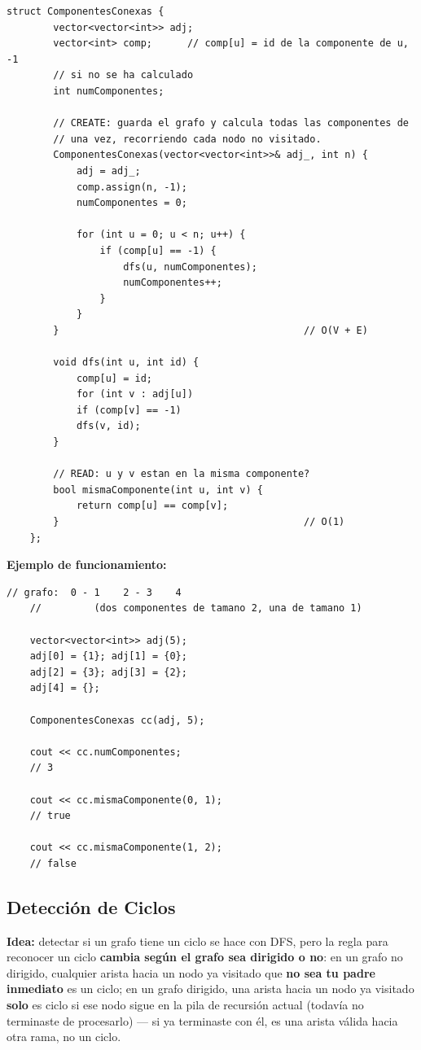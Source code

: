 \documentclass[10pt,a4paper,twocolumn]{article}
\begin{document}
\begin{lstlisting}[style=cpp]
	struct ComponentesConexas {
		vector<vector<int>> adj;
		vector<int> comp;      // comp[u] = id de la componente de u, -1
		// si no se ha calculado
		int numComponentes;
		
		// CREATE: guarda el grafo y calcula todas las componentes de
		// una vez, recorriendo cada nodo no visitado.
		ComponentesConexas(vector<vector<int>>& adj_, int n) {
			adj = adj_;
			comp.assign(n, -1);
			numComponentes = 0;
			
			for (int u = 0; u < n; u++) {
				if (comp[u] == -1) {
					dfs(u, numComponentes);
					numComponentes++;
				}
			}
		}                                          // O(V + E)
		
		void dfs(int u, int id) {
			comp[u] = id;
			for (int v : adj[u])
			if (comp[v] == -1)
			dfs(v, id);
		}
		
		// READ: u y v estan en la misma componente?
		bool mismaComponente(int u, int v) {
			return comp[u] == comp[v];
		}                                          // O(1)
	};
\end{lstlisting}

\textbf{Ejemplo de funcionamiento:}

\begin{lstlisting}[style=cpp]
	// grafo:  0 - 1    2 - 3    4
	//         (dos componentes de tamano 2, una de tamano 1)
	
	vector<vector<int>> adj(5);
	adj[0] = {1}; adj[1] = {0};
	adj[2] = {3}; adj[3] = {2};
	adj[4] = {};
	
	ComponentesConexas cc(adj, 5);
	
	cout << cc.numComponentes;
	// 3
	
	cout << cc.mismaComponente(0, 1);
	// true
	
	cout << cc.mismaComponente(1, 2);
	// false
\end{lstlisting}


\subsection{Detección de Ciclos}

\textbf{Idea:} detectar si un grafo tiene un ciclo se hace con DFS,
pero la regla para reconocer un ciclo \textbf{cambia según el grafo
	sea dirigido o no}: en un grafo no dirigido, cualquier arista hacia
un nodo ya visitado que \textbf{no sea tu padre inmediato} es un
ciclo; en un grafo dirigido, una arista hacia un nodo ya visitado
\textbf{solo} es ciclo si ese nodo sigue en la pila de recursión
actual (todavía no terminaste de procesarlo) — si ya terminaste con
él, es una arista válida hacia otra rama, no un ciclo.
\end{document}
